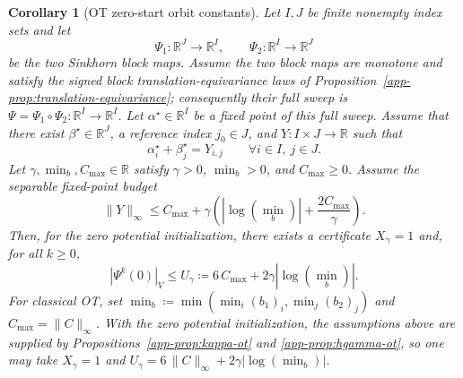 \documentclass{article}
\theoremstyle{plain}
\newtheorem{corollary}{Corollary}[section]
\newcommand{\RR}{\mathbb{R}}
\newcommand{\Umax}{U_\gamma}
\newcommand{\Xmax}{X_\gamma}
\begin{document}
\begin{corollary}[OT zero-start orbit constants]\label{app-cor:ot-xgamma-ugamma}
Let $I,J$ be finite nonempty index sets and let
\[
  \Psi_1:\RR^J\to\RR^I,\qquad
  \Psi_2:\RR^I\to\RR^J
\]
be the two Sinkhorn block maps.  Assume the two block maps are monotone and
satisfy the signed block translation-equivariance laws of
Proposition~\ref{app-prop:translation-equivariance}; consequently their full
sweep is $\Psi=\Psi_1\circ\Psi_2:\RR^I\to\RR^I$.  Let
$\alpha^\star\in\RR^I$ be a fixed point of this full sweep.  Assume that there
exist $\beta^\star\in\RR^J$, a reference index $j_0\in J$, and
$Y:I\times J\to\RR$ such that
\[
  \alpha^\star_i+\beta^\star_j=Y_{i,j}\qquad\forall i\in I,\ j\in J.
\]
Let $\gamma,\min_b,C_{\max}\in\RR$ satisfy
$\gamma>0$, $\min_b>0$, and $C_{\max}\ge0$.  Assume the separable
fixed-point budget
\[
  \|Y\|_\infty
  \le
  C_{\max}+\gamma\left(|\log(\min_b)|+\frac{2C_{\max}}{\gamma}\right).
\]
Then, for the zero potential initialization, there exists a certificate
$\Xmax=1$ and, for all $k\ge0$,
\[
  |\Psi^k(0)|_V
  \le
  \Umax
  \coloneqq
  6\,C_{\max}+2\gamma|\log(\min_b)|.
\]
For classical OT, set
$\min_b\coloneqq\min(\min_i(b_1)_i,\min_j(b_2)_j)$ and
$C_{\max}=\|C\|_\infty$.  With the zero potential initialization, the assumptions
above are supplied by Propositions~\ref{app-prop:kappa-ot} and
\ref{app-prop:hgamma-ot}, so one may take $\Xmax=1$ and
$\Umax=6\,\|C\|_\infty+2\gamma|\log(\min_b)|$.
\end{corollary}
\end{document}
